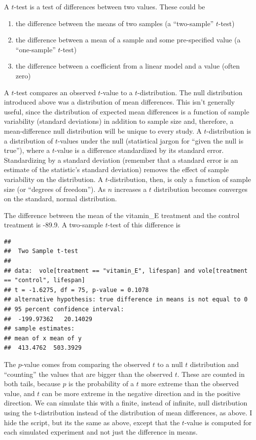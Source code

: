 \documentclass[]{book}
\providecommand{\tightlist}{%
  \setlength{\itemsep}{0pt}\setlength{\parskip}{0pt}}
\begin{document}
A \(t\)-test is a test of differences between two values. These could be

\begin{enumerate}
\def\labelenumi{\arabic{enumi}.}
\tightlist
\item
  the difference between the means of two samples (a ``two-sample''
  \(t\)-test)
\item
  the difference between a mean of a sample and some pre-specified value
  (a ``one-sample'' \(t\)-test)
\item
  the difference between a coefficient from a linear model and a value
  (often zero)
\end{enumerate}

A \(t\)-test compares an observed \(t\)-value to a \(t\)-distribution.
The null distribution introduced above was a distribution of mean
differences. This isn't generally useful, since the distribution of
expected mean differences is a function of sample variability (standard
deviations) in addition to sample size and, therefore, a mean-difference
null distribution will be unique to every study. A \(t\)-distribution is
a distribution of \(t\)-values under the null (statistical jargon for
``given the null is true''), where a \(t\)-value is a difference
standardized by its standard error. Standardizing by a standard
deviation (remember that a standard error is an estimate of the
statistic's standard deviation) removes the effect of sample variability
on the distribution. A \(t\)-distribution, then, is only a function of
sample size (or ``degrees of freedom''). As \(n\) increases a \(t\)
distribution becomes converges on the standard, normal distribution.

The difference between the mean of the vitamin\_E treatment and the
control treatment is -89.9. A two-sample \(t\)-test of this difference
is

\begin{verbatim}
## 
##  Two Sample t-test
## 
## data:  vole[treatment == "vitamin_E", lifespan] and vole[treatment == "control", lifespan]
## t = -1.6275, df = 75, p-value = 0.1078
## alternative hypothesis: true difference in means is not equal to 0
## 95 percent confidence interval:
##  -199.97362   20.14029
## sample estimates:
## mean of x mean of y 
##  413.4762  503.3929
\end{verbatim}

The \(p\)-value comes from comparing the observed \(t\) to a null \(t\)
distribution and ``counting'' the values that are bigger than the
observed \(t\). These are counted in both tails, because \(p\) is the
probability of a \(t\) more extreme than the observed value, and \(t\)
can be more extreme in the negative direction and in the positive
direction. We can simulate this with a finite, instead of infinite, null
distribution using the t-distribution instead of the distribution of
mean differences, as above. I hide the script, but its the same as
above, except that the \(t\)-value is computed for each simulated
experiment and not just the difference in means.
\end{document}
